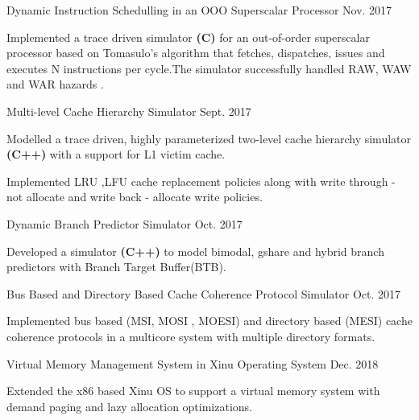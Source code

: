 \begin{cvprojects}
    \cvproject
    {Dynamic Instruction Schedulling in an OOO Superscalar Processor }
    {\color{darkgray}Nov. 2017}
    {
      \begin{cvprojectitems}
        \item {Implemented a trace driven simulator \textbf{(C)} for an out-of-order superscalar processor based on Tomasulo’s algorithm that fetches, dispatches, issues and executes N instructions per cycle.The simulator successfully handled RAW, WAW and WAR hazards .}
      \end{cvprojectitems}
    }

    \cvproject
    {Multi-level Cache Hierarchy Simulator }
    {\color{darkgray}Sept. 2017}
    {
      \begin{cvprojectitems}
        \item {Modelled a trace driven, highly parameterized two-level cache hierarchy simulator \textbf{(C++)} with a support for L1 victim cache. }
        \item {Implemented LRU ,LFU cache replacement policies along with write through - not allocate and write back - allocate write policies.} 
      \end{cvprojectitems}
    }

    \cvproject
    {Dynamic Branch Predictor Simulator }
    {\color{darkgray}Oct. 2017}
    {
      \begin{cvprojectitems1}
        \item {Developed a simulator \textbf{(C++)} to model bimodal, gshare and hybrid branch predictors with Branch Target Buffer(BTB). }
      \end{cvprojectitems1}
    }
    \par\addvspace{-1ex}
     \cvproject
    {Bus Based and Directory Based Cache Coherence Protocol Simulator }
    {\color{darkgray}Oct. 2017}
    { \begin{cvprojectitems1}
        \item {Implemented bus based (MSI, MOSI , MOESI) and directory based (MESI) cache coherence protocols in a multicore system with multiple directory formats.}
      \end{cvprojectitems1}
    }
    \par\addvspace{-1ex}
    \cvproject
    {Virtual Memory Management System in Xinu Operating System }
    {\color{darkgray}Dec. 2018}
    {
      \begin{cvprojectitems1}
        \item {Extended the x86 based Xinu OS to support a virtual memory system with demand paging and lazy allocation optimizations. }
      \end{cvprojectitems1}
    }

\end{cvprojects}